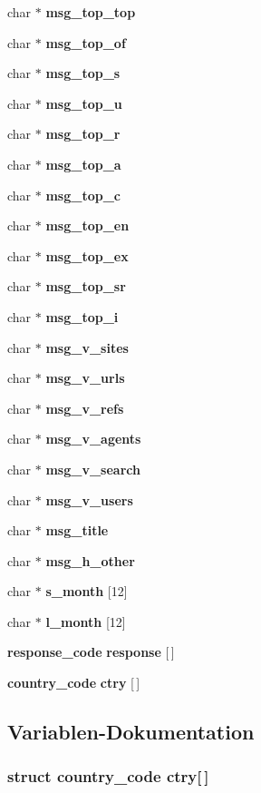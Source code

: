 \begin{CompactItemize}
\item 
char $\ast$ {\bf msg\_\-top\_\-top}
\item 
char $\ast$ {\bf msg\_\-top\_\-of}
\item 
char $\ast$ {\bf msg\_\-top\_\-s}
\item 
char $\ast$ {\bf msg\_\-top\_\-u}
\item 
char $\ast$ {\bf msg\_\-top\_\-r}
\item 
char $\ast$ {\bf msg\_\-top\_\-a}
\item 
char $\ast$ {\bf msg\_\-top\_\-c}
\item 
char $\ast$ {\bf msg\_\-top\_\-en}
\item 
char $\ast$ {\bf msg\_\-top\_\-ex}
\item 
char $\ast$ {\bf msg\_\-top\_\-sr}
\item 
char $\ast$ {\bf msg\_\-top\_\-i}
\item 
char $\ast$ {\bf msg\_\-v\_\-sites}
\item 
char $\ast$ {\bf msg\_\-v\_\-urls}
\item 
char $\ast$ {\bf msg\_\-v\_\-refs}
\item 
char $\ast$ {\bf msg\_\-v\_\-agents}
\item 
char $\ast$ {\bf msg\_\-v\_\-search}
\item 
char $\ast$ {\bf msg\_\-v\_\-users}
\item 
char $\ast$ {\bf msg\_\-title}
\item 
char $\ast$ {\bf msg\_\-h\_\-other}
\item 
char $\ast$ {\bf s\_\-month} [12]
\item 
char $\ast$ {\bf l\_\-month} [12]
\item 
{\bf response\_\-code} {\bf response} [$\,$]
\item 
{\bf country\_\-code} {\bf ctry} [$\,$]
\end{CompactItemize}


\subsection{Variablen-Dokumentation}
\subsubsection{\setlength{\rightskip}{0pt plus 5cm}struct {\bf country\_\-code} {\bf ctry}[$\,$]}\label{lang_8h_2da4e4ffd517ae749587bd8692434663}




